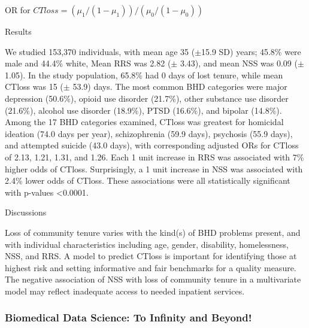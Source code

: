 \begin{itemize}
OR for $CTloss=(\mu_1/(1-\mu_1 ))/(\mu_0/(1-\mu_0 ))$

Results

We studied 153,370 individuals, with mean age 35 ($\pm$15.9 SD) years; 45.8\% were male and 44.4\% white, Mean RRS was 2.82 ($\pm$ 3.43), and mean NSS was 0.09 ($\pm$ 1.05). In the study population, 65.8\% had 0 days of lost tenure, while mean CTloss was 15 ($\pm$ 53.9) days. The most common BHD categories were major depression (50.6\%), opioid use disorder (21.7\%), other substance use disorder (21.6\%), alcohol use disorder (18.9\%), PTSD (16.6\%), and bipolar (14.8\%). Among the 17 BHD categories examined, CTloss was greatest for homicidal ideation (74.0 days per year), schizophrenia (59.9 days), psychosis (55.9 days), and attempted suicide (43.0 days), with corresponding adjusted ORs for CTloss of 2.13, 1.21, 1.31, and 1.26. Each 1 unit increase in RRS was associated with 7\% higher odds of CTloss. Surprisingly, a 1 unit increase in NSS was associated with 2.4\% lower odds of CTloss. These associations were all statistically significant with p-values <0.0001.

Discussions

Loss of community tenure varies with the kind(s) of BHD problems present, and with individual characteristics including age, gender, disability, homelessness, NSS, and RRS. A model to predict CTloss is important for identifying those at highest risk and setting informative and fair benchmarks for a quality measure. The negative association of NSS with loss of community tenure in a multivariate model may reflect inadequate access to needed inpatient services.  


\end{itemize}

\subsubsection*{Biomedical Data Science: To Infinity and Beyond!}

